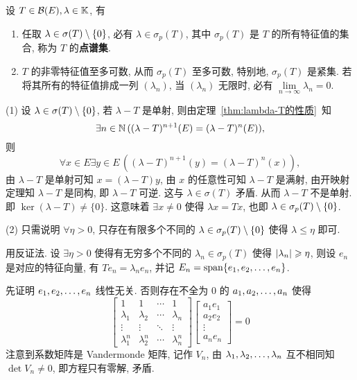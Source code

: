     \begin{Theorem}\label{thm:紧算子的点谱集性质}
        设 $ T\in\mathcal{B}(E), \lambda\in\mathbb{K} $, 有
        \begin{enumerate}[(1)]
            \item 任取 $ \lambda\in\sigma(T)\setminus \{ 0 \} $, 必有 $ \lambda\in\sigma_{p}(T) $, 其中 $ \sigma_{p}(T) $ 是 $ T $ 的所有特征值的集合, 称为 $ T $ 的\textbf{点谱集}.
            \item $ T $ 的非零特征值至多可数, 从而 $ \sigma_{p}(T) $ 至多可数, 特别地,  $ \sigma_{p}(T) $ 是紧集. 若将其所有的特征值排成一列 $ (\lambda_{n}) $, 当 $ (\lambda_{n}) $ 无限时, 必有 $ \lim\limits_{n\to\infty}\lambda_{n}=0 $.
        \end{enumerate}
    \end{Theorem}
    \begin{Proof}
        (1) 设 $ \lambda\in\sigma(T)\setminus\{ 0 \} $, 若 $ \lambda-T $ 是单射, 则由定理~\ref{thm:lambda-T的性质}~知
        \[
            \exists n\in\mathbb{N}\,((\lambda-T)^{n+1}(E)=(\lambda-T)^{n}(E)),
        \]
        则
        \[
            \forall x\in E\exists y\in E\,((\lambda-T)^{n+1}(y)=(\lambda-T)^{n}(x)),
        \]
        由 $ \lambda-T $ 是单射可知 $ x=(\lambda-T)y $, 由 $ x $ 的任意性可知 $ \lambda-T $ 是满射, 由开映射定理知 $ \lambda-T $ 是同构, 即 $ \lambda-T $ 可逆. 这与 $ \lambda\in\sigma(T) $ 矛盾. 从而 $ \lambda-T $ 不是单射. 即 $ \ker(\lambda-T)\ne\{ 0 \} $. 这意味着 $ \exists x\ne 0 $ 使得 $ \lambda x=Tx $, 也即 $ \lambda\in\sigma_{p}(T)\setminus\{ 0 \} $. 

        (2) 只需说明 $ \forall \eta>0 $, 只存在有限多个不同的 $ \lambda\in\sigma_{p}(T)\setminus\{ 0 \} $ 使得 $ \lambda\leqslant\eta $ 即可.

        用反证法. 设 $ \exists\eta>0 $ 使得有无穷多个不同的 $ \lambda_{n}\in\sigma_{p}(T) $ 使得 $ \left| \lambda_{n} \right| \geqslant\eta $, 则设 $ e_{n} $ 是对应的特征向量, 有 $ Te_{n}=\lambda_{n}e_{n} $, 并记 $ E_{n}=\operatorname{span}\{ e_{1}, e_{2}, \dots, e_{n} \} $.

        先证明 $ e_{1}, e_{2}, \dots, e_{n} $ 线性无关. 否则存在不全为 0 的 $ a_{1}, a_{2}, \dots, a_{n} $ 使得
        \[
            \begin{bmatrix}
                1 & 1 & \cdots & 1\\
                \lambda_{1} & \lambda_{2} & \cdots & \lambda_{n}\\
                \vdots & \vdots & \ddots & \vdots \\
                \lambda_{1}^{n} & \lambda_{2}^{n} & \cdots & \lambda_{n}^{n}
            \end{bmatrix}\begin{bmatrix}
                a_{1}e_{1}\\
                a_{2}e_{2}\\
                \vdots\\
                a_{n}e_{n}
            \end{bmatrix}=0
        \]
        注意到系数矩阵是 Vandermonde 矩阵, 记作 $ V_{n} $, 由 $ \lambda_{1}, \lambda_{2}, \dots, \lambda_{n} $ 互不相同知 $ \det V_{n}\ne0 $, 即方程只有零解, 矛盾.


\end{Proof}
